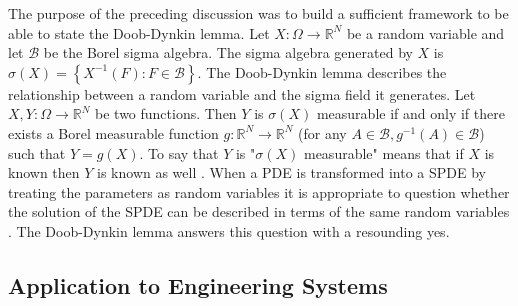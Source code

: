 The purpose of the preceding discussion was to build a sufficient framework to be able to state the Doob-Dynkin lemma. Let $X:\Omega \rightarrow \mathbb{R}^N$ be a random variable and let $\mathcal{B}$ be the Borel sigma algebra. The sigma algebra generated by $X$ is $\sigma\left(X\right)=\left\{X^{-1}\left(F\right):F\in\mathcal{B}\right\}$. The Doob-Dynkin lemma describes the relationship between a random variable and the sigma field it generates. Let $X,Y:\Omega \rightarrow \mathbb{R}^N$ be two functions. Then $Y$ is $\sigma\left(X\right)$ measurable if and only if there exists a Borel measurable function $g:\mathbb{R}^N \rightarrow \mathbb{R}^N$ (for any $A\in \mathcal{B},g^{-1}\left(A\right)\in\mathcal{B}$) such that $Y=g(X)$. To say that $Y$ is "$\sigma\left(X\right)$ measurable" means that if $X$ is known then  $Y$ is known as well \cite{PrbThryPrlms}. When a \ac{PDE} is transformed into a \ac{SPDE} by treating the parameters as random variables it is appropriate to question whether the solution of the \ac{SPDE} can be described in terms of the same random variables \cite{AHSGC}. The Doob-Dynkin lemma answers this question with a resounding yes.
          
\subsection{Application to Engineering Systems} \label{subsec:spde_apps2engineering} 
 
